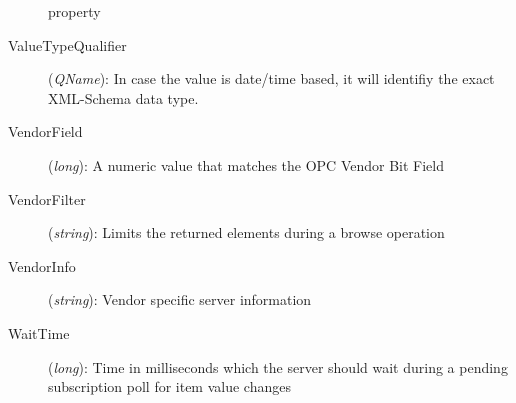 \begin{description}
property
\item[ValueTypeQualifier] ({\sl QName}): In case the value is
date/time based, it will identifiy the exact XML-Schema data type.
\item[VendorField] ({\sl long}): A numeric value that matches the OPC
Vendor Bit Field
\item[VendorFilter] ({\sl string}): Limits the returned elements
during a browse operation
\item[VendorInfo] ({\sl string}): Vendor specific server information
\item[WaitTime] ({\sl long}): Time in milliseconds which the server
should wait during a pending subscription poll for item value changes
\end{description}

